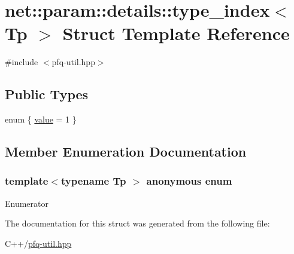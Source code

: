 \hypertarget{structnet_1_1param_1_1details_1_1type__index_3_01Tp_01_4}{\section{net\+:\+:param\+:\+:details\+:\+:type\+\_\+index$<$ Tp $>$ Struct Template Reference}
\label{structnet_1_1param_1_1details_1_1type__index_3_01Tp_01_4}
}


{\ttfamily \#include $<$pfq-\/util.\+hpp$>$}

\subsection*{Public Types}
\begin{DoxyCompactItemize}
\item 
enum \{ \hyperlink{structnet_1_1param_1_1details_1_1type__index_3_01Tp_01_4_aff936ccbc5e8aac0a2398fabfb58cb55a46105c210f804e7866c782cdd2f1c8c9}{value} = 1
 \}
\end{DoxyCompactItemize}


\subsection{Member Enumeration Documentation}
\hypertarget{structnet_1_1param_1_1details_1_1type__index_3_01Tp_01_4_aff936ccbc5e8aac0a2398fabfb58cb55}{\subsubsection[{anonymous enum}]{\setlength{\rightskip}{0pt plus 5cm}template$<$typename Tp $>$ anonymous enum}}\label{structnet_1_1param_1_1details_1_1type__index_3_01Tp_01_4_aff936ccbc5e8aac0a2398fabfb58cb55}
\begin{Desc}
\item[Enumerator]\par
\begin{description}
\item[{\em 
\hypertarget{structnet_1_1param_1_1details_1_1type__index_3_01Tp_01_4_aff936ccbc5e8aac0a2398fabfb58cb55a46105c210f804e7866c782cdd2f1c8c9}{value}\label{structnet_1_1param_1_1details_1_1type__index_3_01Tp_01_4_aff936ccbc5e8aac0a2398fabfb58cb55a46105c210f804e7866c782cdd2f1c8c9}
}]\end{description}
\end{Desc}


The documentation for this struct was generated from the following file\+:\begin{DoxyCompactItemize}
\item 
C++/\hyperlink{pfq-util_8hpp}{pfq-\/util.\+hpp}\end{DoxyCompactItemize}
